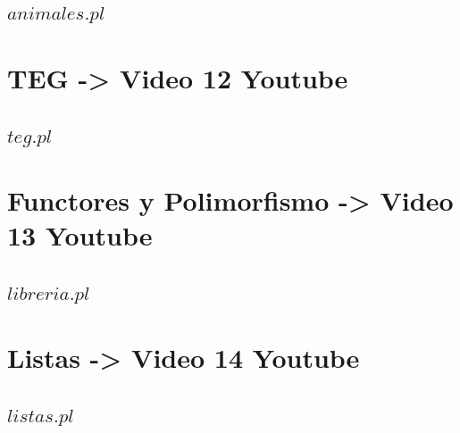 \documentclass[11pt,a4paper]{article}
\begin{document}
\subsection{$animales.pl$}
 

\newpage

\section{TEG -> Video 12 Youtube}

\subsection{$teg.pl$}
 

\newpage

\section{Functores y Polimorfismo -> Video 13 Youtube}
\subsection{$libreria.pl$}
 
 
 
\newpage

\section{Listas -> Video 14 Youtube}
\subsection{$listas.pl$}
 
\newpage

\appendix


%
%
\end{document}
